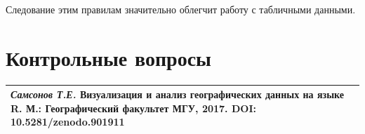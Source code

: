 \documentclass[]{book}
\begin{document}
Следование этим правилам значительно облегчит работу с табличными
данными.

\section{Контрольные вопросы}\label{questions_tables}

\begin{longtable}[]{@{}l@{}}
\toprule
\emph{Самсонов Т.Е.} \textbf{Визуализация и анализ географических данных
на языке R.} М.: Географический факультет МГУ, 2017. DOI:
10.5281/zenodo.901911\tabularnewline
\bottomrule
\end{longtable}


\end{document}
